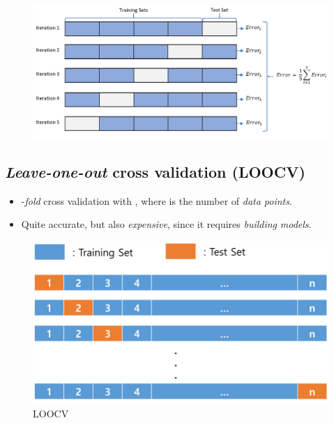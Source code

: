 \documentclass[
	number={1},
	title={Machine Learning Fundamentals}
]{cs584notes}
\begin{document}
\begin{figure}[H]
	\centering
	\includegraphics[width=\textwidth]{figures/1/k-fold-cross-validation}
	\caption{}
	\label{fig:k-fold-cross-validation}
\end{figure}

\subsection{\emph{Leave-one-out} cross validation (LOOCV)}\label{subsec:loocv}
\begin{itemize}
	\item {}-\emph{fold} cross validation with , where  is the number of \emph{data points}.
	\item Quite accurate, but also \emph{expensive}, since it requires \emph{building}  \emph{models}.
\end{itemize}

\begin{figure}[H]
	\centering
	\includegraphics[width=\textwidth]{figures/1/loocv}
	\caption{LOOCV}
	\label{fig:loocv}
\end{figure}
\end{document}
